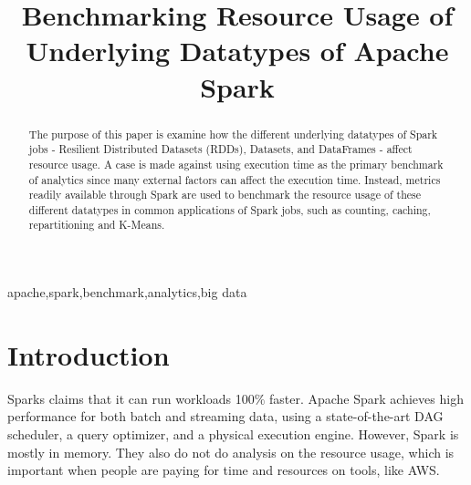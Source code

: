 \documentclass[conference]{IEEEtran}
\begin{document}
\title{Benchmarking Resource Usage of Underlying Datatypes of Apache Spark\\
}

\author{
\and
{}
\and
{}
}

\maketitle

\begin{abstract}
The purpose of this paper is examine how the different underlying datatypes of Spark jobs - Resilient Distributed Datasets (RDDs),
Datasets, and DataFrames - affect resource usage.
A case is made against using execution time as the primary benchmark of analytics since many external factors can affect the execution time.
Instead, metrics readily available through Spark are used to benchmark the resource usage of these different datatypes in common applications of Spark jobs, such as counting, caching, repartitioning and K-Means.
\end{abstract}

\begin{IEEEkeywords}
apache,spark,benchmark,analytics,big data
\end{IEEEkeywords}

\section{Introduction}
Sparks claims that it can run workloads 100$\%$ faster. Apache Spark achieves high performance for both batch and streaming data, using a state-of-the-art DAG scheduler, a query optimizer, and a physical execution engine. However, Spark is mostly in memory. They also do not do analysis on the resource usage, which is important when people are paying for time and resources on tools, like AWS.
\end{document}
